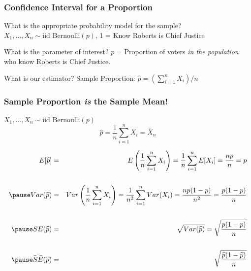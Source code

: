 \documentclass[handout]{beamer}
\begin{document}
\begin{frame}
\frametitle{Confidence Interval for a Proportion}
	\begin{block}{What is the appropriate probability model for the sample?} 
$X_1, \hdots, X_n \sim \mbox{iid Bernoulli}(p)$, 1 = Know Roberts is Chief Justice
\end{block}


	\begin{block}{What is the parameter of interest?}
$p$ = Proportion of voters \emph{in the population} who know Roberts is Chief Justice.
\end{block}



\begin{block}{What is our estimator?} 
Sample Proportion: $\widehat{p} = (\sum_{i=1}^n X_i)/n$
\end{block}
\end{frame}
\begin{frame}
\frametitle{Sample Proportion \emph{is} the Sample Mean!}
\small
$X_1, \hdots, X_n \sim \mbox{iid Bernoulli}(p)$
		$$\widehat{p} = \frac{1}{n} \sum_{i=1}^n X_i = \bar{X}_n$$

\pause


	\begin{eqnarray*}
		E[\widehat{p}] &=&  E\left(\frac{1}{n}\sum_{i=1}^n X_i\right) =  \frac{1}{n} \sum_{i=1}^n E[X_i] =   \frac{np}{n} =  p\\ \\ \pause
		Var(\widehat{p}) &=&  Var\left(\frac{1}{n}\sum_{i=1}^n X_i\right) = \frac{1}{n^2} \sum_{i=1}^n Var(X_i) = \frac{n p(1-p)}{n^2} =  \frac{p(1-p)}{n} \\ \\  \pause
		SE(\widehat{p}) &=&  \sqrt{Var(\widehat{p})} =  \sqrt{\frac{p(1-p)}{n}} \\ \\ \pause
		\widehat{SE}(\widehat{p}) &=&  \sqrt{\frac{\widehat{p}(1-\widehat{p})}{n}}
	\end{eqnarray*}

\end{frame}
\end{document}
